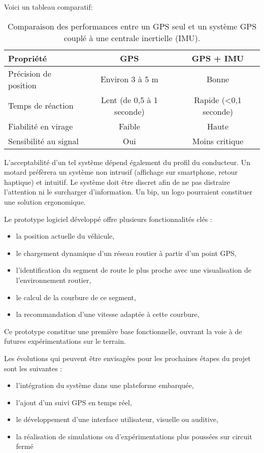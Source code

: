 \vspace{0.5cm}
Voici un tableau comparatif:
\begin{table}[h!]
\centering
\begin{tabular}{|p{4.5cm}|c|c|}
\hline
\textbf{Propriété} & \textbf{GPS} & \textbf{GPS + IMU} \\
\hline
Précision de position & Environ 3 à 5 m & Bonne \\
Temps de réaction & Lent (de 0,5 à 1 seconde) & Rapide (<0,1 seconde) \\
Fiabilité en virage & Faible & Haute \\
Sensibilité au signal & Oui & Moins critique \\
\hline
\end{tabular}
\caption{Comparaison des performances entre un GPS seul et un système GPS couplé à une centrale inertielle (IMU).}
\label{tab:gps-vs-imu}
\end{table}

L’acceptabilité d’un tel système dépend également du profil du conducteur. Un motard préfèrera un système non intrusif (affichage sur smartphone, retour haptique) et intuitif. Le système doit être discret afin de ne pas distraire l’attention ni le surcharger d’information. Un bip, un logo pourraient constituer une solution ergonomique.


Le prototype logiciel développé offre plusieurs fonctionnalités clés :
\begin{itemize}
  \item la position actuelle du véhicule,
  \item le chargement dynamique d’un réseau routier à partir d’un point GPS,
  \item l’identification du segment de route le plus proche avec une visualisation de l’environnement routier,
  \item le calcul de la courbure de ce segment,
  \item la recommandation d’une vitesse adaptée à cette courbure,
\end{itemize}
Ce prototype constitue une première base fonctionnelle, ouvrant la voie à de futures expérimentations sur le terrain.

Les évolutions qui peuvent être envisagées pour les prochaines étapes du projet sont les suivantes :
\begin{itemize}
  \item l’intégration du système dans une plateforme embarquée,
  \item l’ajout d’un suivi GPS en temps réel,
  \item le développement d’une interface utilisateur, visuelle ou auditive,
  \item la réalisation de simulations ou d’expérimentations plus poussées sur circuit fermé
\end{itemize}


